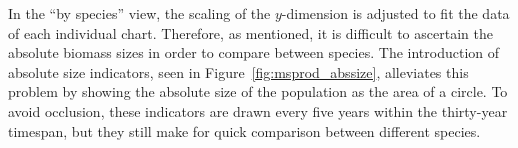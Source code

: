 In the ``by species'' view, the scaling of the $y$-dimension is adjusted to fit the data of each individual chart.  Therefore, as mentioned, it is difficult to ascertain the absolute biomass sizes in order to compare between species.  The introduction of absolute size indicators, seen in Figure~\ref{fig:msprod_abssize}, alleviates this problem by showing the absolute size of the population as the area of a circle.  To avoid occlusion, these indicators are drawn every five years within the thirty-year timespan, but they still make for quick comparison between different species.





